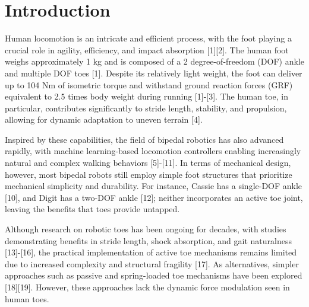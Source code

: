 \documentclass[10pt,twocolumn]{ICCAS}
\begin{document}

\maketitle


\section{Introduction}
Human locomotion is an intricate and efficient process, with the foot playing a crucial role in agility, efficiency, and impact absorption [1][2]. The human foot weighs approximately 1 kg and is composed of a 2 degree-of-freedom (DOF) ankle and multiple DOF toes [1]. Despite its relatively light weight, the foot can deliver up to 104 Nm of isometric torque and withstand ground reaction forces (GRF) equivalent to 2.5 times body weight during running [1]-[3]. The human toe, in particular, contributes significantly to
stride length, stability, and propulsion, allowing for dynamic
adaptation to uneven terrain [4].

Inspired by these capabilities, the field of bipedal robotics has also advanced rapidly, with machine learning-based
locomotion controllers enabling increasingly natural and complex walking behaviors [5]-[11]. In terms of mechanical
design, however, most bipedal robots still employ simple foot structures that prioritize mechanical simplicity and
durability. For instance, Cassie has a single-DOF ankle [10], and Digit has a two-DOF ankle [12]; neither
incorporates an active toe joint, leaving the benefits that toes provide untapped.

Although research on robotic toes has been ongoing for decades, with studies demonstrating benefits in stride length,
shock absorption, and gait naturalness [13]-[16], the practical implementation of active toe mechanisms remains limited
due to increased complexity and structural fragility [17]. As alternatives, simpler approaches such as passive and
spring-loaded toe mechanisms have been explored [18][19]. However, these approaches lack the dynamic
force modulation seen in human toes.
\end{document}
